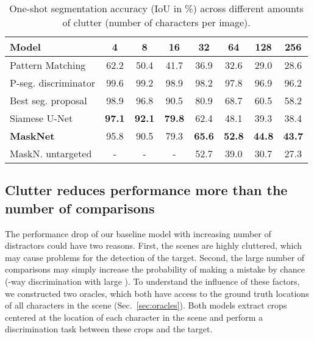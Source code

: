 \documentclass{article}
\begin{document}
\begin{table}[t]
\vspace{-6pt}
\caption{One-shot segmentation accuracy (IoU in \%) across different amounts of clutter (number of characters per image).}
\label{table:results}
\vspace{-0.25cm}
\begin{center}
\begin{tiny}
\begin{sc}
\begin{tabular}{lccccccc}
\toprule
Model & 4 & 8 & 16 & 32 & 64 & 128 & 256 \\
\midrule
Pattern Matching & 62.2 & 50.4 & 41.7 & 36.9 & 32.6 & 29.0 & 28.6\\
P-seg. discriminator & 99.6 & 99.2 & 98.9 & 98.2 & 97.8 & 96.9 & 96.2\\
Best seg. proposal & 98.9 & 96.8 & 90.5 & 80.9 & 68.7 & 60.5 & 58.2\\
\midrule
Siamese U-Net & \bf{97.1} & \bf{92.1} & \bf{79.8} & 62.4 & 48.1 & 39.3 & 38.4\\
{\bf MaskNet} & 95.8 & 90.5 & 79.3 & \bf{65.6} & \bf{52.8} & \bf{44.8} & \bf{43.7}\\
MaskN. untargeted & - & - & - & 52.7 & 39.0 & 30.7 & 27.3\\
\bottomrule
\end{tabular}
\end{sc}
\end{tiny}
\end{center}
\vskip -0.1in
\end{table}


\subsection{Clutter reduces performance more than the number of comparisons}
\label{sec:results/oracles}

The performance drop of our baseline model with increasing number of distractors could have two reasons.
First, the scenes are highly cluttered, which may cause problems for the detection of the target.
Second, the large number of comparisons may simply increase the probability of making a mistake by chance (-way discrimination with large ).
To understand the influence of these factors, we constructed two oracles, which both have access to the ground truth locations of all characters in the scene (Sec.~\ref{sec:oracles}).
Both models extract crops centered at the location of each character in the scene and perform a discrimination task between these crops and the target.
\end{document}

